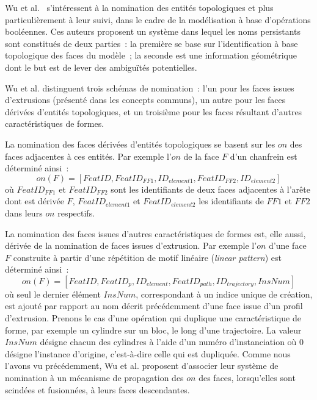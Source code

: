 Wu et al.~\cite{wu2001face} s'intéressent à la nomination des entités
topologiques et plus particulièrement à leur suivi, dans le cadre de la modélisation
à base d'opérations booléennes. %
Ces auteurs proposent un système dans lequel
les noms persistants sont constitués de deux parties~: la première se base sur
l'identification à base topologique des faces du modèle~; la seconde est une information géométrique
dont le but est de lever des ambiguïtés potentielles. %



Wu et al. distinguent trois schémas de nomination~: l’un pour les faces issues
d’extrusions (présenté dans les concepts communs), un
autre pour les faces dérivées d’entités topologiques, et un troisième pour les
faces résultant d’autres caractéristiques de formes. %

La nomination des faces dérivées d'entités topologiques se basent sur les \(on\)
des faces adjacentes à ces entités. %
Par exemple l'\(on\) de la face \(F\) d'un chanfrein est déterminé ainsi~:
\[on(F) = [FeatID, FeatID_{FF1}, ID_{element1},FeatID_{FF2},ID_{element2}]\]
où \(FeatID_{FF1}\) et \(FeatID_{FF2}\) sont les identifiants de deux faces
adjacentes à l'arête dont est dérivée \(F\), \(FeatID_{element1}\) et
\(FeatID_{element2}\) les identifiants de \(FF1\) et \(FF2\) dans leurs \(on\) respectifs. %

La nomination des faces issues d'autres caractéristiques de formes est, elle
aussi, dérivée de la nomination de faces issues d'extrusion. Par exemple
l'\(on\) d'une face \(F\) construite à partir d'une répétition de motif linéaire
(\textit{linear pattern}) est déterminé ainsi~:
\[on(F) = [FeatID, FeatID_{p}, ID_{element}, FeatID_{path},ID_{trajectory}, InsNum]\]
où seul le dernier élément \(InsNum\), correspondant à un indice unique de
création, est ajouté par rapport au nom décrit précédemment d'une face issue
d'un profil d'extrusion. Prenons le cas d'une opération qui duplique une
caractéristique de forme, par exemple un cylindre sur un bloc, le long d'une
trajectoire. %
La valeur \(InsNum\) désigne chacun des cylindres à l'aide d'un numéro
d'instanciation où \(0\) désigne l'instance d'origine, c'est-à-dire celle qui
est dupliquée. %
Comme nous l'avons vu précédemment, Wu et al. proposent d'associer leur
système de nomination à un mécanisme de propagation des \(on\) des faces,
lorsqu'elles sont scindées et fusionnées, à leurs faces descendantes.

